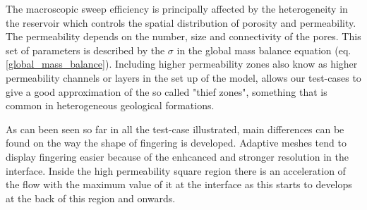 \documentclass[preprint,authoryear,12pt]{elsarticle}
\begin{document}

\medskip
The macroscopic sweep efficiency is principally affected by the heterogeneity in the reservoir which controls the spatial distribution of porosity and permeability. The permeability depends on the number, size and connectivity of the pores. This set of parameters is described by the $\sigma$ in the global mass balance equation (eq.\ref{global_mass_balance}). Including higher permeability zones also know as higher permeability channels or layers in the set up of the model, allows our test-cases to give a good approximation of the so called "thief zones", something that is common in heterogeneous geological formations.

\medskip 
As can been seen so far in all the test-case illustrated, main differences can be found on the way the shape of fingering is developed. Adaptive meshes tend to display fingering easier because of the enhcanced and stronger resolution in the interface. Inside the high permeability square region there is an acceleration of the flow with the maximum value of it at the interface as this starts to develops at the back of this region and onwards. %
\end{document}
